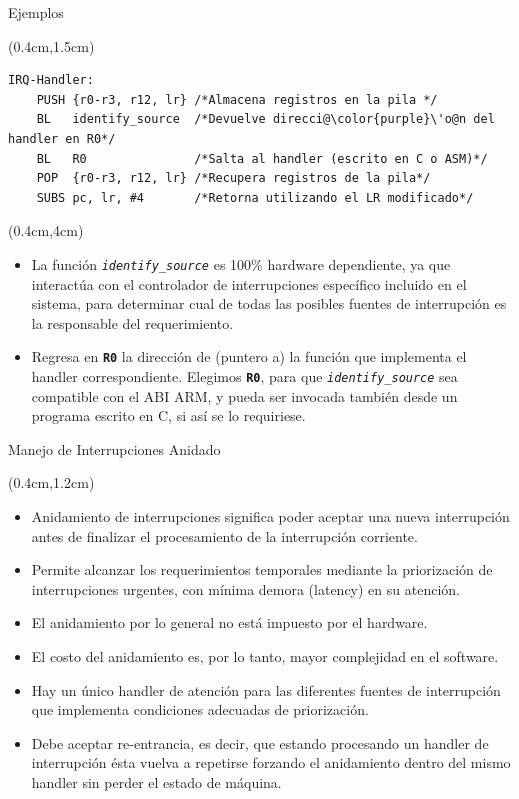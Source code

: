 \documentclass[table,x11names,aspectratio=169]{beamer}
\begin{document}
\begin{frame}[t,fragile]{Ejemplos}
 \begin{textblock*}{\textwidth}(0.4cm,1.5cm) \justifying
   \begin{lstlisting}[basicstyle=\scriptsize,escapechar=\@,numbers=none, frame=single, xleftmargin=20pt, xrightmargin=0pt,]
IRQ-Handler:
    PUSH {r0-r3, r12, lr} /*Almacena registros en la pila */
    BL   identify_source  /*Devuelve direcci@\color{purple}\'o@n del handler en R0*/
    BL   R0               /*Salta al handler (escrito en C o ASM)*/
    POP  {r0-r3, r12, lr} /*Recupera registros de la pila*/
    SUBS pc, lr, #4       /*Retorna utilizando el LR modificado*/
   \end{lstlisting}
 \end{textblock*}
 \begin{textblock*}{\textwidth}(0.4cm,4cm) 
  \begin{itemize}[<+(1)->]\justifying \parskip 0.2cm
   \item La función \textit{\texttt{identify\_source}} es 100\% hardware dependiente, ya que interactúa con el controlador de interrupciones específico incluido en el sistema, para determinar cual de todas las posibles fuentes de interrupción es la responsable del requerimiento.
   \item Regresa en \texttt{\textbf{R0}} la dirección de (puntero a) la función que implementa el handler correspondiente. Elegimos \texttt{\textbf{R0}}, para que \textit{\texttt{identify\_source}} sea compatible con el ABI ARM, y pueda ser invocada también desde un programa escrito en C, si así se lo requiriese.
  \end{itemize}
 \end{textblock*}
\end{frame}

\begin{frame}[t]{Manejo de Interrupciones Anidado}
 \begin{textblock*}{\textwidth}(0.4cm,1.2cm) 
  \begin{itemize}[<+(1)->]\justifying
   \item Anidamiento de interrupciones significa poder aceptar una nueva interrupción antes de finalizar el procesamiento de la interrupción corriente.
   \item Permite alcanzar los requerimientos temporales mediante la priorización de interrupciones urgentes, con mínima demora (latency) en su atención.
   \item El anidamiento por lo general no está impuesto por el hardware.
   \item El costo del anidamiento es, por lo tanto,  mayor complejidad en el software.
   \item Hay un único handler de atención para las diferentes fuentes de interrupción que implementa condiciones adecuadas de priorización.
   \item Debe aceptar re-entrancia, es decir, que estando procesando un handler de interrupción ésta vuelva a repetirse forzando el anidamiento dentro del mismo handler sin perder el estado de máquina.
  \end{itemize}
 \end{textblock*}
\end{frame}
   
\end{document}
